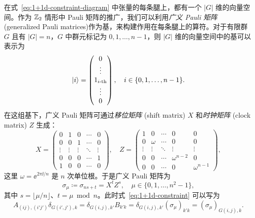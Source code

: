 在式~\eqref{eq:1+1d-constraint-diagram} 中张量的每条腿上，都有一个 $|G|$ 维的向量空间。作为 $\mathbb{Z}_2$ 情形中 Pauli 矩阵的推广，我们可以利用\emph{广义 Pauli 矩阵} (generalized Pauli matrices)\cite{patera1988pauli}作为基，来构建作用在每条腿上的算符。对于有限群 $G$ 且有 $|G|=n$，$G$ 中群元标记为 $0,1,\dots,n-1$，则 $|G|$ 维的向量空间中的基可以表示为
\begin{equation}
  \ket{i} = \begin{pmatrix} 0 \\ \vdots \\ 1_{\text{$i$-th}} \\ \vdots \\ 0 \end{pmatrix}, \quad
  i \in \{ 0, 1, \dots, n-1 \}.
\end{equation}
在这组基下，广义 Pauli 矩阵可通过\emph{移位矩阵} (shift matrix) $X$ 和\emph{时钟矩阵} (clock matrix) $Z$ 生成：
\begin{equation}
  X = \begin{pmatrix}
    0      & 1      & 0      & \cdots & 0      \\
    0      & 0      & 1      & \cdots & 0      \\
    \vdots & \vdots & \vdots & \ddots & \vdots \\
    0      & 0      & 0      & \cdots & 1      \\
    1      & 0      & 0      & \cdots & 0
  \end{pmatrix}, \quad
  Z = \begin{pmatrix}
    1      & 0      & \cdots & 0            & 0      \\
    0      & \omega & \cdots & 0            & 0      \\
    \vdots & \vdots & \ddots & \vdots       & \vdots \\
    0      & 0      & \cdots & \omega^{n-2} & 0      \\
    0      & 0      & \cdots & 0            & \omega^{n-1}
  \end{pmatrix},
  \label{eq:generalized-pauli-matrices}
\end{equation}
这里 $\omega=\ee^{2\pi\ii/n}$ 是 $n$ 次单位根。于是广义 Pauli 矩阵为
\begin{equation}
  \sigma_\mu \coloneq \sigma_{ns+t} = X^t Z^s, \quad \mu \in \{0,1,\dots,n^2-1\},
\end{equation}
其中 $s=\lfloor\mu/n\rfloor$、$t=\mu\bmod n$。此时式~\eqref{eq:1+1d-constraint} 可以写为
\begin{equation}
    A_{(ij), (i'j')} \delta_{G(i',j'), k}
  = \delta_{G(i,j), k'} B_{k'k}
  = \delta_{G(i,j), k'} (\sigma_\mu)_{k'k}
  = (\sigma_\mu)_{G(i,j), k}.
  \label{eq:1+1d-constraint-in-sigma}
\end{equation}
